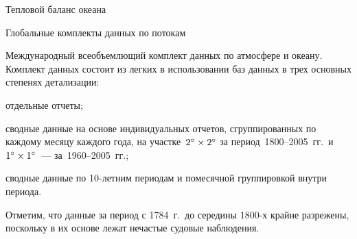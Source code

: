 \begin{chapter}{Тепловой баланс океана}
\begin{section}{Глобальные комплекты данных по потокам}
\begin{paragraph}{Международный всеобъемлющий комплект данных по атмосфере 
и океану.}
Комплект данных состоит из легких в использовании баз данных в трех основных
степенях детализации: 
\begin{enumparen}
\item
отдельные отчеты; 
\item
сводные данные на основе индивидуальных отчетов, сгруппированных по каждому
месяцу каждого года, на участке~${2}^\circ\times{2}^\circ$ за 
период~1800--2005~гг.\ и~${1}^\circ\times{1}^\circ$~--- за~1960--2005~гг.;

\item
сводные данные по 10-летним периодам и помесячной группировкой внутри периода.
\end{enumparen}
%
Отметим, что данные за период с 1784~г.\ до середины 1800-х крайне разрежены,
поскольку в их основе лежат нечастые судовые наблюдения.
%


\end{paragraph}
\end{section}
\end{chapter}
